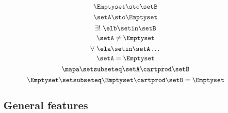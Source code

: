 {\begin{forslides}
    \begin{equation}
        \label{eq:slides_session2_114}
        \Emptyset \sto \setB
    \end{equation}
    \begin{equation}
        \label{eq:slides_session2_115}
        \setA \sto \Emptyset
    \end{equation}
    \begin{equation}
        \label{eq:slides_session2_116}
        \exists ! \ \elb \setin\setB
    \end{equation}
    \begin{equation}
        \label{eq:slides_session2_117}
        \setA \neq \Emptyset
    \end{equation}
    \begin{equation}
        \label{eq:slides_session2_118}
        \forall \ \ela \setin\setA \dots
    \end{equation}
    \begin{equation}
        \label{eq:slides_session2_119}
        \setA = \Emptyset
    \end{equation}
    \begin{equation}
        \label{eq:slides_session2_120}
        \mapa \setsubseteq \setA \cartprod \setB
    \end{equation}
    \begin{equation}
        \label{eq:slides_session2_121}
        \Emptyset \setsubseteq \Emptyset \cartprod \setB = \Emptyset
    \end{equation}

    \subsection{General features}


\end{forslides}}
